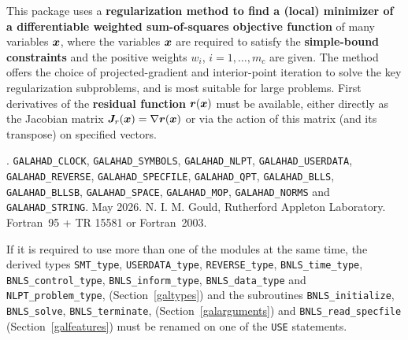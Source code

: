 \documentclass{galahad}
\newcommand{\packagename}{BNLS}
\newcommand{\fullpackagename}{\libraryname\_\packagename}
\begin{document}
\galheader


\galsummary
This package uses a {\bf regularization method to find a (local)
minimizer of a differentiable weighted sum-of-squares objective function}
of many variables ${\bm{x}}$,
where the variables ${\bm{x}}$ are required to satisfy the 
{\bf simple-bound constraints}
and the positive weights $w_i$, $i=1,\ldots,m_c$ are given.
The method offers the choice of projected-gradient and interior-point
iteration to solve the key regularization subproblems,
and is most suitable for large problems.
First derivatives of the {\bf residual function}
${\bm{r}}({\bm{x}})$ must be available, either directly as the Jacobian matrix 
${\bm{J}}_r({\bm{x}}) = \nabla {\bm{r}}({\bm{x}})$ or via the action of this matrix
(and its transpose) on specified vectors.


\galattributes
\galversions{\tt  \fullpackagename\_single, \fullpackagename\_double}.
\galuses
{\tt GALAHAD\_CLOCK},
{\tt GALAHAD\_SY\-M\-BOLS},
{\tt GALAHAD\_NLPT},
{\tt GALAHAD\_USERDATA},
{\tt GALAHAD\_REVERSE},
{\tt GALAHAD\_SPECFILE},
{\tt GALAHAD\_QPT},
{\tt GALAHAD\_BLLS},
{\tt GALAHAD\_BLLSB},
{\tt GALAHAD\_\-SPACE},
{\tt GALAHAD\_MOP},
{\tt GALAHAD\_NORMS}
and
{\tt GALAHAD\_STRING}.
\galdate May 2026.
\galorigin N. I. M. Gould, Rutherford Appleton Laboratory.
\gallanguage Fortran~95 + TR 15581 or Fortran~2003.


\galhowto



\noindent
If it is required to use more than one of the modules at the same time, 
the derived types
{\tt SMT\_type},
{\tt USERDATA\_type},
{\tt REVERSE\_type},
{\tt \packagename\_time\_\-type},
{\tt \packagename\_control\_type},
{\tt \packagename\_inform\_type},
{\tt \packagename\_data\_type}
and
{\tt NLPT\_problem\_\-type},
(Section~\ref{galtypes})
and the subroutines
{\tt \packagename\_initialize},
{\tt \packagename\_\-solve},
{\tt \packagename\_terminate},
(Section~\ref{galarguments})
and
{\tt \packagename\_\-read\_specfile}
(Section~\ref{galfeatures})
must be renamed on one of the {\tt USE} statements.
\end{document}
